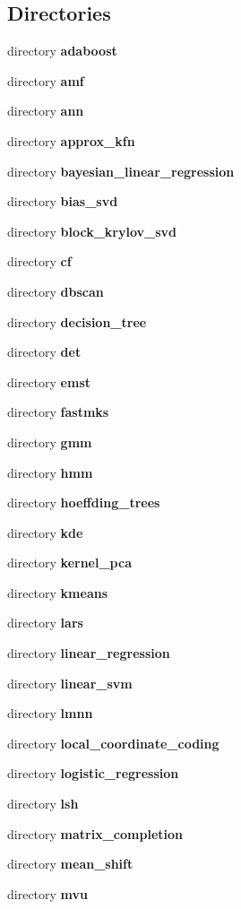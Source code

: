 \subsection*{Directories}
\begin{DoxyCompactItemize}
\item 
directory \textbf{ adaboost}
\item 
directory \textbf{ amf}
\item 
directory \textbf{ ann}
\item 
directory \textbf{ approx\+\_\+kfn}
\item 
directory \textbf{ bayesian\+\_\+linear\+\_\+regression}
\item 
directory \textbf{ bias\+\_\+svd}
\item 
directory \textbf{ block\+\_\+krylov\+\_\+svd}
\item 
directory \textbf{ cf}
\item 
directory \textbf{ dbscan}
\item 
directory \textbf{ decision\+\_\+tree}
\item 
directory \textbf{ det}
\item 
directory \textbf{ emst}
\item 
directory \textbf{ fastmks}
\item 
directory \textbf{ gmm}
\item 
directory \textbf{ hmm}
\item 
directory \textbf{ hoeffding\+\_\+trees}
\item 
directory \textbf{ kde}
\item 
directory \textbf{ kernel\+\_\+pca}
\item 
directory \textbf{ kmeans}
\item 
directory \textbf{ lars}
\item 
directory \textbf{ linear\+\_\+regression}
\item 
directory \textbf{ linear\+\_\+svm}
\item 
directory \textbf{ lmnn}
\item 
directory \textbf{ local\+\_\+coordinate\+\_\+coding}
\item 
directory \textbf{ logistic\+\_\+regression}
\item 
directory \textbf{ lsh}
\item 
directory \textbf{ matrix\+\_\+completion}
\item 
directory \textbf{ mean\+\_\+shift}
\item 
directory \textbf{ mvu}
\item 

\end{DoxyCompactItemize}
